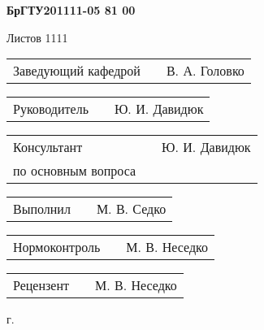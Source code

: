 \documentclass[a4paper]{article}
\begin{document}
\vspace{32pt}

\begin{Center}{
\cyrillicfontsf 
\englishfontsf
\bfseries
\fontsize{16pt}{0pt}\selectfont 
    БрГТУ201111-05 81 00
}\end{Center}

\vspace{22pt}

\begin{Center}{
\cyrillicfontsf 
\englishfontsf
\fontsize{16pt}{0pt}\selectfont 
    Листов 1111
}\end{Center}

\vspace{22pt}

\begin{FlushLeft} {
\cyrillicfontsf 
\englishfontsf
\fontsize{14pt}{0pt}\selectfont 

  \begin{tabular}{p{6.5cm} p{4.767cm} p{5.633cm}}
    \raggedleft Заведующий кафедрой & & В. А. Головко  
  \end{tabular}

  \vspace{14pt}
  
  \begin{tabular}{p{6.5cm} p{4.767cm} p{5.633cm}}
    \raggedleft Руководитель & & Ю. И. Давидюк \\ 
  \end{tabular}

  \vspace{14pt}

  \begin{tabular}{p{6.5cm} p{4.767cm} p{5.633cm}}
    \raggedleft Консультант & & Ю. И. Давидюк \\
    \raggedleft по основным вопроса & &
  \end{tabular}

  \vspace{14pt}

  \begin{tabular}{p{6.5cm} p{4.767cm} p{5.633cm}}
    \raggedleft Выполнил & & М. В. Седко \\
  \end{tabular}

  \vspace{14pt}

  \begin{tabular}{p{6.5cm} p{4.767cm} p{5.633cm}}
    \raggedleft Нормоконтроль & & М. В. Неседко \\
  \end{tabular}

  \vspace{14pt}

  \begin{tabular}{p{6.5cm} p{4.767cm} p{5.633cm}}
    \raggedleft Рецензент & & М. В. Неседко \\
  \end{tabular}
  
}\end{FlushLeft}

\begin{Center}{
\cyrillicfontsf 
\englishfontsf
\fontsize{14pt}{21pt} г.
}\end{Center}
\end{document}
